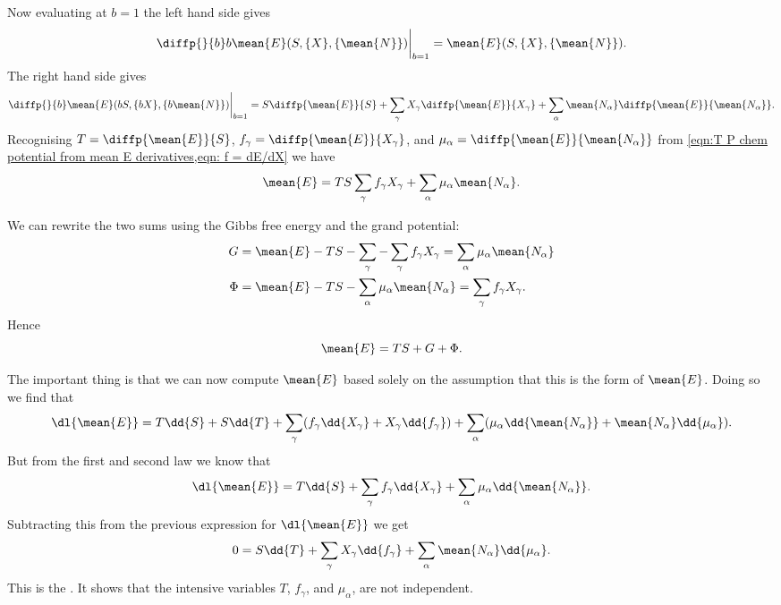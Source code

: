 \documentclass[fleqn]{NotesClass}
\begin{document}
    Now evaluating at \(b = 1\) the left hand side gives
    \begin{equation}
        \diffp{}{b} b\mean{E}(S, \{X\}, \{\mean{N}\}) \bigg\vert_{b=1} = \mean{E}(S, \{X\}, \{\mean{N}\}).
    \end{equation}
    The right hand side gives
    \begin{equation}
        \diffp{}{b}\mean{E}(bS, \{bX\}, \{b\mean{N}\}) \bigg\vert_{b=1} = S\diffp{\mean{E}}{S} + \sum_{\gamma} X_\gamma\diffp{\mean{E}}{X_\gamma} + \sum_{\alpha} \mean{N_{\alpha}} \diffp{\mean{E}}{\mean{N_\alpha}}.
    \end{equation}
    Recognising \(T = \diffp{\mean{E}}{S}\), \(f_\gamma = \diffp{\mean{E}}{X_\gamma}\), and \(\mu_\alpha = \diffp{\mean{E}}{\mean{N_\alpha}}\) from \cref{eqn:T P chem potential from mean E derivatives,eqn: f = dE/dX} we have
    \begin{equation}
        \mean{E} = TS \sum_{\gamma} f_\gamma X_\gamma + \sum_{\alpha} \mu_\alpha \mean{N_\alpha}.
    \end{equation}
    
    We can rewrite the two sums using the Gibbs free energy and the grand potential:
    \begin{align}
        G &= \mean{E} - TS - \sum_{\gamma} - \sum_{\gamma} f_\gamma X_\gamma = \sum_\alpha \mu_\alpha \mean{N_\alpha}\\
        \Phi &= \mean{E} - TS - \sum_\alpha \mu_\alpha \mean{N_\alpha} = \sum_\gamma f_\gamma X_\gamma.
    \end{align}
    Hence 
    \begin{equation}
        \mean{E} = TS + G + \Phi.
    \end{equation}
    
    The important thing is that we can now compute \(\mean{E}\) based solely on the assumption that this is the form of \(\mean{E}\).
    Doing so we find that
    \begin{equation}
        \dl{\mean{E}} = T\dd{S} + S\dd{T} + \sum_\gamma (f_\gamma\dd{X_\gamma} + X_\gamma\dd{f_\gamma}) + \sum_\alpha (\mu_\alpha \dd{\mean{N_\alpha}} + \mean{N_\alpha}\dd{\mu_\alpha}).
    \end{equation}
    But from the first and second law we know that
    \begin{equation}
        \dl{\mean{E}} = T\dd{S} + \sum_\gamma f_\gamma\dd{X_\gamma} + \sum_\alpha \mu_\alpha \dd{\mean{N_\alpha}}.
    \end{equation}
    Subtracting this from the previous expression for \(\dl{\mean{E}}\) we get
    \begin{equation}
        0 = S\dd{T} + \sum_\gamma X_\gamma \dd{f_\gamma} + \sum_\alpha \mean{N_\alpha} \dd{\mu_\alpha}.
    \end{equation}
    This is the .
    It shows that the intensive variables \(T\), \(f_\gamma\), and \(\mu_\alpha\), are not independent.
    
\end{document}
